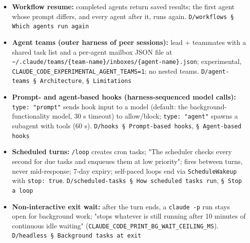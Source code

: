 \begin{itemize}
\item \textbf{Workflow resume:} completed agents return saved results; the first agent whose prompt differs, and every agent after it, runs again. \texttt{D/\allowbreak{}workflows § Which agents run again}
\item \textbf{Agent teams (outer harness of peer sessions):} lead + teammates with a shared task list and a per-agent mailbox JSON file at \texttt{\textasciitilde{}/\allowbreak{}.\allowbreak{}claude/\allowbreak{}teams/\allowbreak{}\{team-\allowbreak{}name\}/\allowbreak{}inboxes/\allowbreak{}\{agent-\allowbreak{}name\}.\allowbreak{}json}; experimental, \texttt{CLAUDE\_\allowbreak{}CODE\_\allowbreak{}EXPERIMENTAL\_\allowbreak{}AGENT\_\allowbreak{}TEAMS=1}; no nested teams. \texttt{D/\allowbreak{}agent-\allowbreak{}teams § Architecture}, \texttt{§ Limitations}
\item \textbf{Prompt- and agent-based hooks (harness-sequenced model calls):} \texttt{type:\allowbreak{} "prompt"} sends hook input to a model (default: the background-functionality model, 30 s timeout) to allow/block; \texttt{type:\allowbreak{} "agent"} spawns a subagent with tools (60 s). \texttt{D/\allowbreak{}hooks § Prompt-\allowbreak{}based hooks}, \texttt{§ Agent-\allowbreak{}based hooks}
\item \textbf{Scheduled turns:} \texttt{/\allowbreak{}loop} creates cron tasks; "The scheduler checks every second for due tasks and enqueues them at low priority"; fires between turns, never mid-response; 7-day expiry; self-paced loops end via \texttt{ScheduleWakeup} with \texttt{stop:\allowbreak{} true}. \texttt{D/\allowbreak{}scheduled-\allowbreak{}tasks § How scheduled tasks run}, \texttt{§ Stop a loop}
\item \textbf{Non-interactive exit wait:} after the turn ends, a \texttt{claude -\allowbreak{}p} run stays open for background work; "stops whatever is still running after 10 minutes of continuous idle waiting" (\texttt{CLAUDE\_\allowbreak{}CODE\_\allowbreak{}PRINT\_\allowbreak{}BG\_\allowbreak{}WAIT\_\allowbreak{}CEILING\_\allowbreak{}MS}). \texttt{D/\allowbreak{}headless § Background tasks at exit}
\end{itemize}

